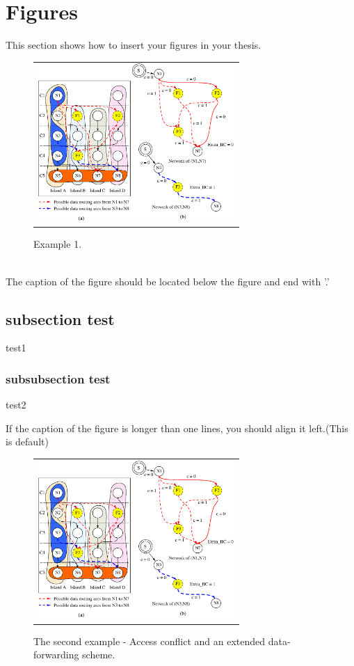 \documentclass[master,korean]{snuee}
\begin{document}
    \section{Figures}
    This section shows how to insert your figures in your thesis.\\
    \begin{figure}[htbp]
    {
    \begin{center}
    \begin{tabular}{c}
	\includegraphics[height=6cm]{Sample.eps}
    \end{tabular}
    \end{center}
    }
    \caption{Example 1.}
    \end{figure}\\
    The caption of the figure should be located below the figure and end with '.'
    \subsection{subsection test}
    test1

    \subsubsection{subsubsection test}
    test2

    \newpage
    If the caption of the figure is longer than one lines, you should
    align it left.(This is default)\\

    \begin{figure}[htbp]
    {
    \begin{center}
    \begin{tabular}{c}
	\includegraphics[height=6cm]{Sample.eps}
    \end{tabular}
    \end{center}
    }
    \caption{The second example - Access conflict and an extended
data-forwarding scheme. }
    \end{figure}
    \newpage
\end{document}
